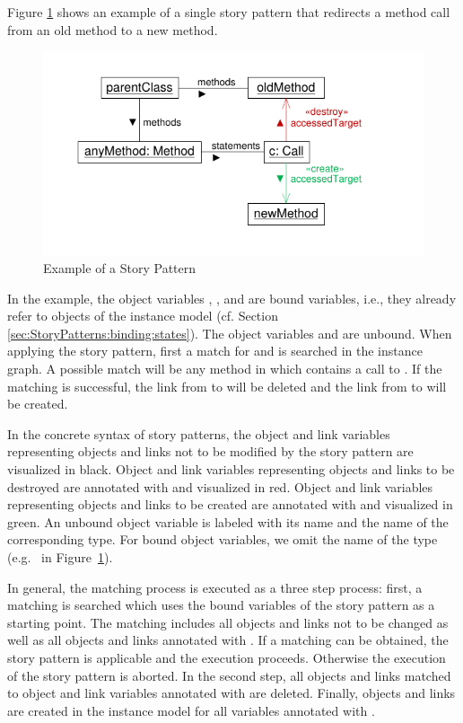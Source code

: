 Figure \ref{fig:simpleStoryPattern} shows an example of a single story pattern that redirects a method call from an old method to a new method.
\begin{figure}[htbp]
  \centering
  \includegraphics[scale=1.0]{figures/SimpleStoryPattern}
  \caption{Example of a Story Pattern}
  \label{fig:simpleStoryPattern}
\end{figure}
In the example, the object variables , , and  are bound variables, i.e., they already refer to objects of the instance model (cf. Section \ref{sec:StoryPatterns:binding:states}).
The object variables  and  are unbound. 
When applying the story pattern, first a match for  and  is searched in the instance graph. 
A possible match will be any method in  which contains a call to . 
If the matching is successful, the link from  to  will be deleted and the link from  to  will be created.

In the concrete syntax of story patterns, the object and link variables representing objects and links not to be modified by the story pattern are visualized in black. 
Object and link variables representing objects and links to be destroyed are annotated with \destroy and visualized in red. 
Object and link variables representing objects and links to be created are annotated with \create and visualized in green. 
An unbound object variable is labeled with its name and the name of the corresponding type. 
For bound object variables, we omit the name of the type (e.g.\  in Figure~\ref{fig:simpleStoryPattern}).

In general, the matching process is executed as a three step process:
first, a matching is searched which uses the bound variables of the story pattern as a starting point. 
The matching includes all objects and links not to be changed as well as all objects and links annotated with \destroy. 
If a matching can be obtained, the story pattern is applicable and the execution proceeds. 
Otherwise the execution of the story pattern is aborted.
In the second step, all objects and links matched to object and link variables annotated with \destroy are deleted. 
Finally, objects and links are created in the instance model for all variables annotated with \create.

